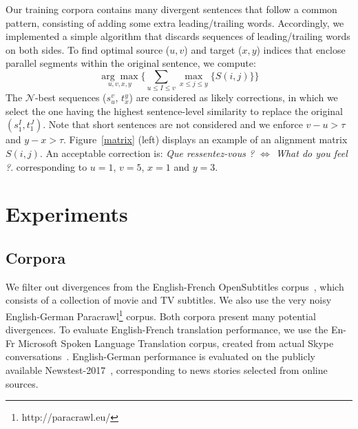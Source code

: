 \documentclass[11pt,a4paper]{article}
\begin{document}
Our training corpora contains many divergent sentences that follow a common pattern, consisting of adding some extra leading/trailing words. %
Accordingly, we implemented a simple algorithm that discards sequences of leading/trailing words on both sides. 
To find optimal source ($u, v$) and target ($x, y$) indices that enclose parallel segments within the original sentence, we compute:
\begin{equation*}
\underset{u, v, x, y}{\arg\max} \Big \{      \underset{u \le I \le v}{\sum} \underset{x \le j \le y}{\max} \{ S(i,j) \}    \Big \}
\end{equation*}
The $\mathcal{N}$-best sequences ($s_u^v$, $t_x^y$) are considered as likely corrections, in which we select the one having the highest sentence-level similarity to replace the original $(s_1^I, t_1^J)$.
Note that short sentences are not considered and we enforce $v - u > \tau$ and $y - x > \tau $. 
Figure~\ref{matrix} (left) displays an example of an alignment matrix $S(i,j)$.
An acceptable correction is: \textit{Que ressentez-vous ? $\Leftrightarrow$ What do you feel ?}. 
corresponding to $u=1$, $v=5$, $x=1$ and $y=3$.

\section{Experiments}
\label{experiments}


\subsection{Corpora}
\label{corpora}

We filter out divergences from the English-French OpenSubtitles corpus~\cite{LisonTiedemann2016}, which consists of a collection of movie and TV subtitles. 
We also use the very noisy English-German Paracrawl\footnote{http://paracrawl.eu/} corpus. Both corpora present many potential divergences.
To evaluate English-French translation performance, we use the En-Fr Microsoft Spoken Language Translation corpus, created from actual Skype conversations~\cite{mslt-corpus-iwslt-2016-release}. 
English-German performance is evaluated on the publicly available Newstest-2017~\cite{W17-4717}, corresponding to news stories selected from online sources.
\end{document}
